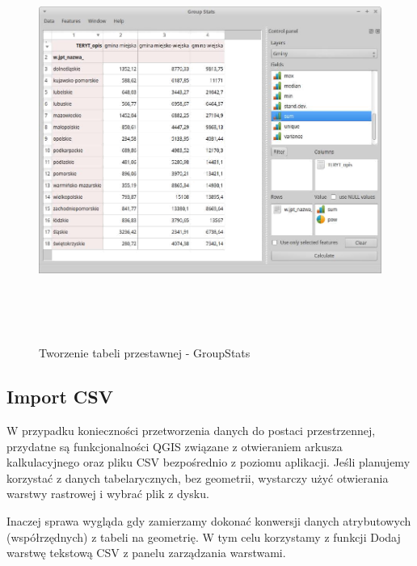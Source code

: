 \documentclass[12pt,a4paper]{book}
\begin{document}
\begin{center}
\begin{figure}
\includegraphics[width=17cm,height=13.222cm]{003-tabela-przestawna.png}
\caption{Tworzenie tabeli przestawnej - GroupStats}
\end{figure}
\end{center}
\subsection{Import CSV}
W przypadku konieczności przetworzenia danych do postaci przestrzennej, przydatne są funkcjonalności QGIS związane z otwieraniem arkusza kalkulacyjnego oraz pliku CSV bezpośrednio z poziomu aplikacji. Jeśli planujemy korzystać z danych tabelarycznych, bez geometrii, wystarczy użyć otwierania warstwy rastrowej i wybrać plik z dysku.

Inaczej sprawa wygląda gdy zamierzamy dokonać konwersji danych atrybutowych (współrzędnych) z tabeli na geometrię. W tym celu korzystamy z funkcji  Dodaj warstwę tekstową CSV  z panelu zarządzania warstwami.
\end{document}
